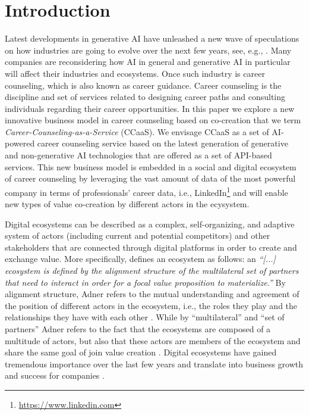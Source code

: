 \section{Introduction}
\label{sec:introduction}

Latest developments in generative AI have unleashed a new wave of speculations on how industries are going to
evolve over the next few years, see, e.g., \cite{chuiHowGenerativeAI2022}. Many companies are reconsidering how
AI in general and generative AI in particular will affect their industries and ecosystems. Once such industry is
career counseling, which is also known as career guidance. Career counseling is the discipline and set of services
related to designing career paths and consulting individuals regarding their career opportunities.
In this paper we explore a new innovative business model in career counseling based on co-creation that we term
\textit{Career-Counseling-as-a-Service} (CCaaS). We envisage CCaaS as a set of AI-powered career counseling service
based on the latest generation of generative and non-generative AI technologies that are offered as a set of API-based
services. This new business model is embedded in a social and digital ecosystem of career counseling by leveraging the
vast amount of data of the most powerful company in terms of professionals' career data, i.e., LinkedIn\footnote[1]{\url{https://www.linkedin.com}}
and will enable new types of value co-creation by different actors in the ecysystem.

Digital ecosystems can be described as a complex, self-organizing, and adaptive system of actors (including current and
potential competitors) and other stakeholders that are connected through digital platforms in order to create and exchange
value. More specifically, \cite{adnerEcosystemStructureActionable2017} defines an ecosystem as follows: an \textit{``[...]
ecosystem is defined by the alignment structure of the multilateral set of partners that need to interact in order for a
focal value proposition to materialize.''} By alignment structure, Adner refers to the mutual understanding and agreement
of the position of different actors in the ecosystem, i.e., the roles they play and the relationships they have with each other
\citep[p. 42]{adnerEcosystemStructureActionable2017}. While by ``multilateral'' and ``set of partners'' Adner refers to
the fact that the ecosystems are composed of a multitude of actors, but also that these actors are members of the ecosystem
and share the same goal of join value creation \citep[p. 42-43]{adnerEcosystemStructureActionable2017}. Digital ecosystems
have gained tremendous importance over the last few years and translate into business growth and success for companies
\citep{weillThrivingIncreasinglyDigital2015}.

